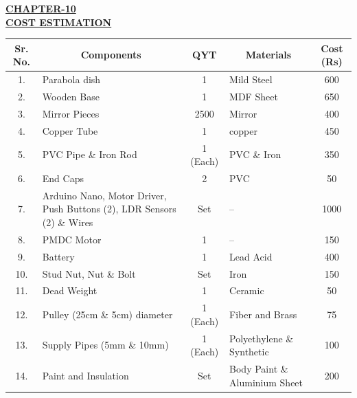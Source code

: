 \begin{center}
  {\fontsize{15}{18}\selectfont \bfseries \textcolor{red!80!black}{\underline{CHAPTER-10}}}\\[2mm]
  {\fontsize{16}{20}\selectfont \bfseries \textcolor{red!80!black}{\underline{COST ESTIMATION}}}\\[5mm]
\end{center}

\begin{center}
\renewcommand{\arraystretch}{1.22}
\begin{tabular}{|c|p{45mm}|c|p{35mm}|c|}
\hline
\rowcolor{gray!20}
\textbf{Sr. No.} & \multicolumn{1}{c|}{\textbf{Components}} & \textbf{QYT} & \multicolumn{1}{c|}{\textbf{Materials}} & \textbf{Cost (Rs)} \\
\hline
1. & Parabola dish & 1 & Mild Steel & 600 \\
\hline
2. & Wooden Base & 1 & MDF Sheet & 650 \\
\hline
3. & Mirror Pieces & 2500 & Mirror & 400 \\
\hline
4. & Copper Tube & 1 & copper & 450 \\
\hline
5. & PVC Pipe \& Iron Rod & 1 (Each) & PVC \& Iron & 350 \\
\hline
6. & End Caps & 2 & PVC & 50 \\
\hline
7. & Arduino Nano, Motor Driver, Push Buttons (2), LDR Sensors (2) \& Wires & Set & -- & 1000 \\
\hline
8. & PMDC Motor & 1 & -- & 150 \\
\hline
9. & Battery & 1 & Lead Acid & 400 \\
\hline
10. & Stud Nut, Nut \& Bolt & Set & Iron & 150 \\
\hline
11. & Dead Weight & 1 & Ceramic & 50 \\
\hline
12. & Pulley (25cm \& 5cm) diameter & 1 (Each) & Fiber and Brass & 75 \\
\hline
13. & Supply Pipes (5mm \& 10mm) & 1 (Each) & Polyethylene \& Synthetic & 100 \\
\hline
14. & Paint and Insulation & Set & Body Paint \& Aluminium Sheet & 200 \\
\hline
\end{tabular}
\end{center}
\clearpage
